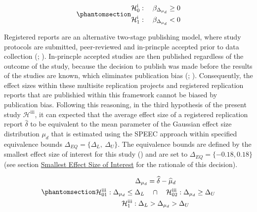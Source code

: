 \documentclass[
  12pt,
]{scrartcl}
\newcommand{\hypothesis}[2]{\mathcal{H}^{\text{#1}}_{\text{#2}}}
\begin{document}
\begin{equation}\phantomsection\label{eq-h2}{
\begin{gathered}
\hypothesis{i}{0}: \quad \beta_{\Delta_{\mu_d}} \geq 0 \\ 
\hypothesis{i}{1}: \quad \beta_{\Delta_{\mu_d}} < 0
\end{gathered}
}\end{equation}

Registered reports are an alternative two-stage publishing model, where
study protocols are submitted, peer-reviewed and in-princple accepted
prior to data collection (; ). In-princple accepted studies are then published regardless of
the outcome of the study, because the decision to publish was made
before the results of the studies are known, which eliminates
publication bias (; ). Consequently, the effect sizes within these multisite
replication projects and registered replication reports that are
publishied within this framework cannot be biased by publication bias.
Following this reasoning, in the third hypothesis of the present study
\(\hypothesis{iii}{}\), it can expected that the average effect size of
a registered replication report \(\widehat{\delta}\) to be equivalent to
the mean parameter of the Gaussian effect size distribution \(\mu_d\)
that is estimated using the SPEEC approach within specified equivalence
bounds \(\Delta_{EQ} = \{\Delta_L, ~ \Delta_U\}\). The equivalence
bounds are defined by the smallest effect size of interest for this
study () and
are set to \(\Delta_{EQ}=\{-0.18, 0.18\}\) (see section
\hyperref[smallest-effect-size-of-interest]{Smallest Effect Size of
Interest} for the rationale of this decision).

\begin{equation}\phantomsection\label{eq-h3}{
\begin{gathered}
\Delta_{\mu_d}=\widehat{\delta}-\widehat{\mu}_d \\
\hypothesis{iii}{01}: \Delta_{\mu_d} \leq \Delta_{L} \quad \cap \quad \hypothesis{iii}{02}: \Delta_{\mu_d} \geq \Delta_{U} \\
\hypothesis{iii}{1}: \Delta_L >\Delta_{\mu_d} > \Delta_U
\end{gathered}
}\end{equation}
\end{document}
